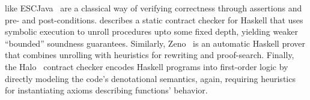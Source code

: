 like ESCJava~\cite{ESCJava} are a classical way of verifying 
correctness through assertions and pre- and post-conditions. 
%
%
%
%
\cite{XuPOPL09} describes a static contract checker for 
Haskell that uses symbolic execution to unroll procedures
upto some fixed depth, yielding weaker ``bounded'' soundness
guarantees.
% 
%
Similarly, Zeno~\cite{ZENO} is an automatic Haskell 
prover that combines unrolling with heuristics for rewriting
and proof-search. 
%
Finally, the Halo~\cite{halo} contract checker encodes 
Haskell programs into first-order logic by directly 
modeling the code's denotational semantics,
again, requiring heuristics for instantiating axioms 
describing functions' behavior.
%

